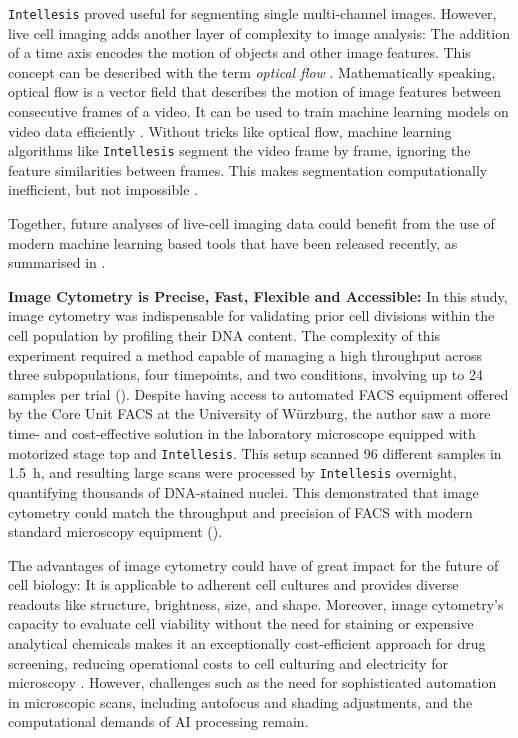 \texttt{Intellesis} proved useful for segmenting single multi-channel images.
However, live cell imaging adds another layer of complexity to image analysis:
The addition of a time axis encodes the motion of objects and other image
features. This concept can be described with the term \emph{optical flow}
\cite{niehorsterOpticFlowHistory2021}. Mathematically speaking, optical flow is
a vector field that describes the motion of image
features between consecutive frames of a video. It
can be used to train machine learning models on video data efficiently
\cite{robitailleSelfsupervisedMachineLearning2022}. Without tricks like optical
flow, machine learning algorithms like \texttt{Intellesis} segment the video
frame by frame, ignoring the feature similarities between frames. This makes
segmentation computationally inefficient, but not impossible
\cite{pylvanainenLivecellImagingDeep2023}.

Together, future analyses of live-cell imaging data could  benefit
from the use of modern machine learning based tools that have been released
recently, as summarised in \citet{pylvanainenLivecellImagingDeep2023}.



\textbf{Image Cytometry is Precise, Fast, Flexible and Accessible:}
In this study, image cytometry was indispensable for validating prior cell
divisions within the \nMAina cell population by profiling their DNA content. The
complexity of this experiment required a method capable of managing a high
throughput across three subpopulations, four timepoints, and two conditions,
involving up to 24 samples per trial (). Despite
having access to automated \ac{FACS} equipment offered by the Core Unit FACS at
the University of Würzburg, the author saw a more time- and cost-effective
solution in the laboratory microscope equipped with motorized stage top and
\texttt{Intellesis}. This setup scanned 96 different samples in \SI{1.5}{\hour},
and resulting large scans were processed by \texttt{Intellesis} overnight,
quantifying thousands of DNA-stained nuclei. This demonstrated that image
cytometry could match the throughput and precision of \ac{FACS} with modern
standard microscopy equipment ().

The advantages of image cytometry could have of great impact for the future of
cell biology: It is applicable to adherent cell cultures
\cite{roukosCellCycleStaging2015} and provides diverse readouts like structure,
brightness, size, and shape. Moreover, image cytometry’s capacity to evaluate
cell viability without the need for staining or expensive analytical chemicals
makes it an exceptionally cost-efficient approach for drug screening, reducing
operational costs to cell culturing and electricity for microscopy
\cite{pattaroneLearningDeepFeatures2021}.  However, challenges such as the need
for sophisticated automation in microscopic scans, including autofocus and
shading adjustments, and the computational demands of AI processing remain.


